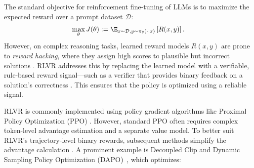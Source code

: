 The standard objective for reinforcement fine-tuning of LLMs is to maximize the expected reward over a prompt dataset $\mathcal{D}$:
\begin{equation}
\label{eq:rl-main-objective}
    \max_\theta J(\theta) := \E_{x \sim \mathcal{D}, y \sim \pi_\theta(\cdot\mid x)}\left[ R(x, y) \right].
\end{equation}
However, on complex reasoning tasks, learned reward models $R(x,y)$ are prone to \emph{reward hacking}, where they assign high scores to plausible but incorrect solutions \citep{gao2023scaling, perez2023discovering, weng2024rewardhack, wcq2025beyond}. RLVR addresses this by replacing the learned model with a verifiable, rule-based reward signal—such as a verifier that provides binary feedback on a solution's correctness \citep{guo2025deepseek}. This ensures that the policy is optimized using a reliable signal.

RLVR is commonly implemented using policy gradient algorithms like Proximal Policy Optimization (PPO) \citep{schulman2017proximal}. However, standard PPO often requires complex token-level advantage estimation and a separate value model. To better suit RLVR's trajectory-level binary rewards, subsequent methods simplify the advantage calculation \citep{shao2024deepseekmath,yu2025dapo}. A prominent example is Decoupled Clip and Dynamic Sampling Policy Optimization (DAPO)~\citep{yu2025dapo}, which optimizes:

